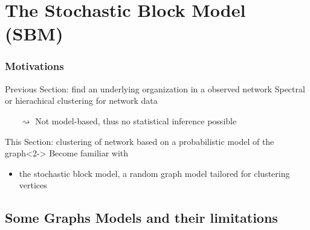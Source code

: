 \documentclass{beamer}\usepackage[]{graphicx}\usepackage[]{color}
\begin{document}
\section{The Stochastic Block Model (SBM)}

\begin{frame}
  \frametitle{Motivations}

  \begin{block}{Previous Section: \alert{find an underlying organization in a observed network}}
    Spectral or hierachical clustering for network data \\
    \begin{itemize}
      \item[$\rightsquigarrow$] \alert{Not model-based}, thus no statistical inference possible
    \end{itemize}
  \end{block}

  \begin{block}{This Section: \alert{clustering of network based on a probabilistic model of the graph}}<2->
    Become familiar with
    \begin{itemize}
      \item the stochastic block model, a random graph model tailored for clustering vertices
    \end{itemize}
  \end{block}

\end{frame}

\subsection{Some Graphs Models and their limitations}
\end{document}
